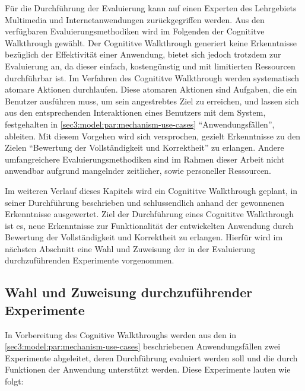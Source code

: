 Für die Durchführung der Evaluierung kann auf einen Experten des Lehrgebiets Multimedia und Internetanwendungen zurückgegriffen werden.
Aus den verfügbaren Evaluierungsmethodiken wird im Folgenden der Cognititve Walkthrough gewählt.
Der Cognititve Walkthrough generiert keine Erkenntnisse bezüglich der Effektivität einer Anwendung, bietet sich jedoch trotzdem zur Evaluierung an, da dieser einfach, kostengünstig und mit limitierten Ressourcen durchführbar ist.
Im Verfahren des Cognititve Walkthrough werden systematisch atomare Aktionen durchlaufen.
Diese atomaren Aktionen sind Aufgaben, die ein Benutzer ausführen muss, um sein angestrebtes Ziel zu erreichen, und lassen sich aus den entsprechenden Interaktionen eines Benutzers mit dem System, festgehalten in \cref{sec3:model:par:mechanism-use-cases} \enquote{Anwendungsfällen}, ableiten.
Mit diesem Vorgehen wird sich versprochen, gezielt Erkenntnisse zu den Zielen \enquote{Bewertung der Vollständigkeit und Korrektheit} zu erlangen.
Andere umfangreichere Evaluierungsmethodiken sind im Rahmen dieser Arbeit nicht anwendbar aufgrund mangelnder zeitlicher, sowie personeller Ressourcen.

Im weiteren Verlauf dieses Kapitels wird ein Cognititve Walkthrough geplant, in seiner Durchführung beschrieben und schlussendlich anhand der gewonnenen Erkenntnisse ausgewertet.
Ziel der Durchführung eines Cognititve Walkthrough ist es, neue Erkenntnisse zur Funktionalität der entwickelten Anwendung durch Bewertung der Vollständigkeit und Korrektheit zu erlangen.
Hierfür wird im nächsten Abschnitt eine Wahl und Zuweisung der in der Evaluierung durchzuführenden Experimente vorgenommen.

\subsection{Wahl und Zuweisung durchzuführender Experimente}
\label{sec5:eval:subsec:assign-exper}
In Vorbereitung des Cognitive Walkthroughs werden aus den in \cref{sec3:model:par:mechanism-use-cases} beschriebenen Anwendungsfällen zwei Experimente abgeleitet, deren Durchführung evaluiert werden soll und die durch Funktionen der Anwendung unterstützt werden.
Diese Experimente lauten wie folgt:

